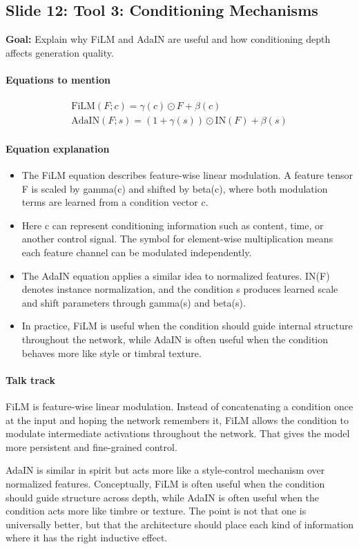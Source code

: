 \documentclass[11pt]{article}
\begin{document}
\subsection*{Slide 12: Tool 3: Conditioning Mechanisms}
\textbf{Goal:} Explain why FiLM and AdaIN are useful and how conditioning depth affects generation quality.
\paragraph{Equations to mention}
\begin{align*}
\mathrm{FiLM}(F;c)=\gamma(c)\odot F+\beta(c)\\
\mathrm{AdaIN}(F;s)=(1+\gamma(s))\odot \mathrm{IN}(F)+\beta(s)
\end{align*}
\paragraph{Equation explanation}
\begin{itemize}
\item The FiLM equation describes feature-wise linear modulation. A feature tensor F is scaled by gamma(c) and shifted by beta(c), where both modulation terms are learned from a condition vector c.
\item Here c can represent conditioning information such as content, time, or another control signal. The symbol for element-wise multiplication means each feature channel can be modulated independently.
\item The AdaIN equation applies a similar idea to normalized features. IN(F) denotes instance normalization, and the condition s produces learned scale and shift parameters through gamma(s) and beta(s).
\item In practice, FiLM is useful when the condition should guide internal structure throughout the network, while AdaIN is often useful when the condition behaves more like style or timbral texture.
\end{itemize}
\paragraph{Talk track}
FiLM is feature-wise linear modulation. Instead of concatenating a condition once at the input and hoping the network remembers it, FiLM allows the condition to modulate intermediate activations throughout the network. That gives the model more persistent and fine-grained control.

AdaIN is similar in spirit but acts more like a style-control mechanism over normalized features. Conceptually, FiLM is often useful when the condition should guide structure across depth, while AdaIN is often useful when the condition acts more like timbre or texture. The point is not that one is universally better, but that the architecture should place each kind of information where it has the right inductive effect.
\end{document}

